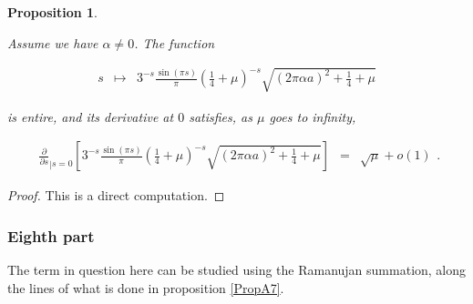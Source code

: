\documentclass{jams-l}
\newtheorem{proposition}[theorem]{Proposition}
\theoremstyle{definition}
\theoremstyle{remark}
\numberwithin{equation}{section}
\begin{document}
            \begin{proposition}
            \label{PropA7-0}
            
                Assume we have $\alpha \neq 0$. The function
                
                \[ \begin{array}{lll}
                        s & \longmapsto & 3^{-s} \frac{\sin \left( \pi s \right)}{\pi} \left( \frac{1}{4} + \mu \right)^{-s} \sqrt{\left( 2 \pi \alpha a \right)^2 + \frac{1}{4} + \mu}
                    \end{array} \]
                
                \noindent is entire, and its derivative at $0$ satisfies, as $\mu$ goes to infinity,
                
                \[ \begin{array}{lll}
                        \frac{\partial}{\partial s}_{\left \vert s = 0 \right.} \left[ 3^{-s} \frac{\sin \left( \pi s \right)}{\pi} \left( \frac{1}{4} + \mu \right)^{-s} \sqrt{\left( 2 \pi \alpha a \right)^2 + \frac{1}{4} + \mu} \right] & = & \sqrt{\mu} + o \left( 1 \right)
                    \end{array} . \]
            
            \end{proposition}
            
            \begin{proof}
            
                This is a direct computation.
            
            \end{proof}
            
            
        \subsubsection*{\textbf{Eighth part}}
        \label{AEighthPart}
            
            The term in question here can be studied using the Ramanujan summation, along the lines of what is done in proposition \ref{PropA7}.
            
\end{document}
